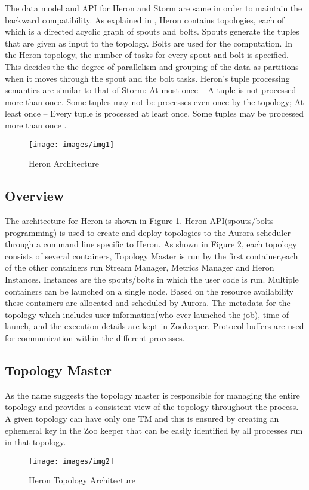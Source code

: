 \documentclass[9pt,twocolumn,twoside]{../../styles/osajnl}
\begin{document}
The data model and API for Heron and Storm are same in order to maintain the backward compatibility. As explained in \cite{TwitterHeron2}, Heron contains topologies, each of which is a directed acyclic graph of spouts and bolts. Spouts generate the tuples that are given as input to the topology. Bolts are used for the computation. In the Heron topology, the number of tasks for every spout and bolt is specified. This decides the the degree of parallelism and grouping of the data as partitions when it moves through the spout and the bolt tasks. Heron’s tuple processing semantics are similar to that of Storm: At most once – A tuple is not processed more than once. Some tuples may not be processes even once by the topology; At least once – Every tuple is processed at least once. Some tuples may be processed more than once \cite{TwitterHeron2}.
\begin{figure}[htbp]
\begin{center}
\centering
\texttt{[image: images/img1]}
\caption{Heron Architecture \cite{TwitterHeron2}}
\label{fig:false-color}
\end{center}
\end{figure}
\subsection{Overview}
The architecture for Heron is shown in Figure 1. Heron API(spouts/bolts programming) is used to create and
deploy topologies to the Aurora scheduler through a command line specific to Heron. As shown in Figure 2, each topology consists of several containers, Topology Master is run by the first container,each of the other containers run Stream Manager, Metrics Manager and Heron Instances. Instances are the spouts/bolts in which the user code is run. Multiple containers can be launched on a single node. Based on the resource availability these containers are allocated and scheduled by Aurora. The metadata for the topology which includes user information(who ever launched the job), time of launch, and the execution details are kept in Zookeeper. Protocol buffers  are used for communication within the different processes.
\subsection{Topology Master}
As the name suggests the topology master is responsible for managing the entire topology and provides a consistent view of the topology throughout the process. A given topology can have only one TM and this is ensured by creating an ephemeral key in the Zoo keeper that can be easily identified by all processes run in that topology. 
\begin{figure}[htbp]
\begin{center}
\centering
\texttt{[image: images/img2]}
\caption{Heron Topology Architecture \cite{TwitterHeron2}}
\label{fig:false-color}
\end{center}
\end{figure}
\end{document}
